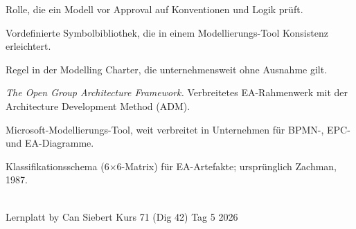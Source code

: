 \documentclass[11pt,a4paper,oneside]{article}
\begin{document}
\begin{description}[style=nextline,leftmargin=0pt,labelindent=0pt,itemsep=4pt]
  \item[Reviewer] Rolle, die ein Modell vor Approval auf Konventionen und Logik prüft.
  \item[Shapeset] Vordefinierte Symbolbibliothek, die in einem Modellierungs-Tool Konsistenz erleichtert.
  \item[Standard (nicht verhandelbar)] Regel in der Modelling Charter, die unternehmensweit ohne Ausnahme gilt.
  \item[TOGAF] \emph{The Open Group Architecture Framework.} Verbreitetes EA-Rahmenwerk mit der Architecture Development Method (ADM).
  \item[Visio] Microsoft-Modellierungs-Tool, weit verbreitet in Unternehmen für BPMN-, EPC- und EA-Diagramme.
  \item[Zachman-Framework] Klassifikationsschema (6$\times$6-Matrix) für EA-Artefakte; ursprünglich Zachman, 1987.
\end{description}

\vspace{1cm}
\noindent{\color{lpAccent}\rule{\linewidth}{0.6pt}}\\[4pt]
{\footnotesize\sffamily\color{lpGray}Lernplatt \textperiodcentered{} by Can Siebert \textperiodcentered{} Kurs 71 (Dig 42) \textperiodcentered{} Tag 5 \textperiodcentered{} \textcopyright{} 2026}
\end{document}
